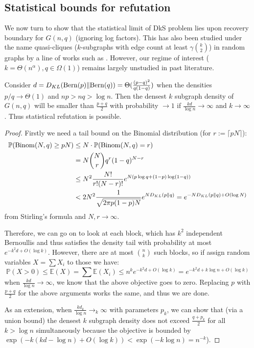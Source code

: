 \documentclass[final,12pt]{colt2023} %
\newcommand\1[1]{\mathbb{I}_{\left\{#1\right\}}}
\begin{document}
\subsection{Statistical bounds for refutation}
We now turn to show that the statistical limit of DkS problem lies upon recovery boundary for $G(n, q)$ (ignoring log factors). This has also been studied under the name quasi-cliques ($k$-subgraphs with edge count at least $\gamma{k\choose 2}$) in random graphs by a line of works such as \cite{VBKJ,AS16,DkSErdos}. However, our regime of interest ($k=\Theta(n^{\alpha}), q\in\Omega(1)$) remains largely unstudied in past literature.
\begin{theorem}\label{Thm: StatDKS}
Consider $d=D_{KL}({\rm Bern}(p)\|{\rm Bern}(q))=\Theta(\frac{(p-q)^2}{q(1-q)})$ when the densities $p/q\to \Theta(1)$ and $np>nq>\log n$. Then the densest $k$ subgraph density of $G(n, q)$ will be smaller than $\frac{p+q}{2}$ with probability $\to 1$ if $\frac{kd}{\log n}\to\infty$ and $k\to\infty$. Thus statistical refutation is possible.
\end{theorem}
\begin{proof}
Firstly we need a tail bound on the Binomial distribution (for $r:=\lceil{pN}\rceil$):
\begin{align*}
    \mathbb{P}({\rm Binom}(N, q)\geq pN)&\leq N\cdot\mathbb{P}({\rm Binom}(N, q)=r)\\
    &=N{N\choose{r}}q^r(1-q)^{N-r}\\
    &\leq N^2\frac{N!}{r!(N-r)!}e^{N(p\log q+(1-p)\log (1-q))}\\&<2N^2\frac{1}{\sqrt{2\pi p(1-p) N}}e^{N D_{KL}(p\|q)}=e^{-N D_{KL}(p\|q)+O(\log N)}
\end{align*}from Stirling's formula and $N, r\to \infty$.

\spac Therefore, we can go on to look at each block, which has $k^2$ independent Bernoullis and thus satisfies the density tail with probability at most $e^{-k^2d+O(\log k)}$. However, there are at most $n\choose k$ such blocks, so if assign random variables $X=\sum X_i$ to those we have:
$$\mathbb{P}(X>0)\leq \mathbb{E}(X)=\sum \mathbb{E}(X_i)\leq n^ke^{-k^2d+O(\log k)}=e^{-k^2d+k\log n+O(\log k)}$$when $\frac{kd}{\log n}\to\infty$, we know that the above objective goes to zero. Replacing $p$ with $\frac{p+q}{2}$ for the above arguments works the same, and thus we are done. 

\spac As an extension, when $\frac{k d_k}{\log n}\to_k\infty$ with parameters $p_k$, we can show that (via a union bound) the densest $k$ subgraph density does not exceed $\frac{q+p_k}{2}$ for all $k>\log n$ simultaneously because the objective is bounded by $\exp\left(-k(kd-\log n)+O(\log k)\right)<\exp(-k\log n)=n^{-k}$).
\end{proof}
\end{document}
